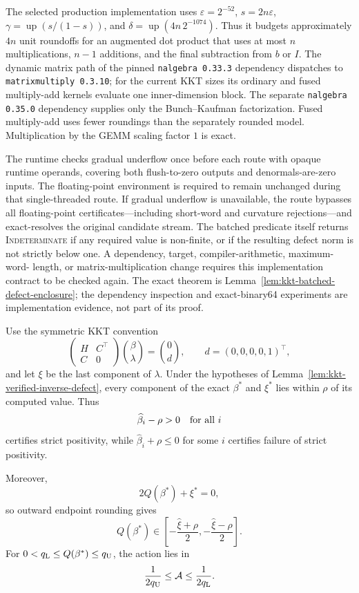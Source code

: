 \begin{remark}%
\label{rem:kkt-batched-binary64-contract}
The selected production implementation uses
\(\varepsilon=2^{-52}\), \(s=2n\varepsilon\),
\(\gamma=\operatorname{up}(s/(1-s))\), and
\(\delta=\operatorname{up}(4n\,2^{-1074})\).
Thus it budgets approximately \(4n\) unit roundoffs for an augmented dot
product that uses at most \(n\) multiplications, \(n-1\) additions, and the
final subtraction from \(b\) or \(I\).  The dynamic
matrix path of the pinned \texttt{nalgebra 0.33.3} dependency dispatches to
\texttt{matrixmultiply 0.3.10}; for the current KKT sizes its ordinary and
fused multiply-add kernels evaluate one inner-dimension block.  The separate
\texttt{nalgebra 0.35.0} dependency supplies only the Bunch--Kaufman
factorization.  Fused
multiply-add uses fewer roundings than the separately rounded model.
Multiplication by the GEMM scaling factor \(1\) is exact.

The runtime checks gradual underflow once before each route with opaque runtime
operands, covering both flush-to-zero outputs and denormals-are-zero inputs.
The floating-point environment is required to remain unchanged during that
single-threaded route.  If gradual underflow is unavailable, the route bypasses
all floating-point certificates---including short-word and curvature
rejections---and exact-resolves the original candidate stream.  The batched
predicate itself returns \textsc{Indeterminate}
if any required value is non-finite, or if the resulting defect norm is not
strictly below one.  A dependency, target, compiler-arithmetic, maximum-word-
length, or matrix-multiplication change requires this implementation contract
to be checked again.  The exact theorem is
Lemma~\ref{lem:kkt-batched-defect-enclosure}; the dependency inspection and
exact-binary64 experiments are implementation evidence, not part of its proof.
\end{remark}

\begin{corollary}%
\label{cor:kkt-beta-q-from-xi}
Use the symmetric KKT convention
\[
 \begin{pmatrix}H&C^\top\\ C&0\end{pmatrix}
 \binom{\beta}{\lambda}
 =
 \binom{0}{d},
 \qquad
 d=(0,0,0,0,1)^\top,
\]
and let \(\xi\) be the last component of \(\lambda\).  Under the hypotheses of
Lemma~\ref{lem:kkt-verified-inverse-defect}, every component of the exact
\(\beta^*\) and \(\xi^*\) lies within \(\rho\) of its computed value.  Thus
\[
 \widehat\beta_i-\rho>0\quad\hbox{for all \(i\)}
\]
certifies strict positivity, while
\(\widehat\beta_i+\rho\leq0\) for some \(i\) certifies failure of strict
positivity.

Moreover,
\[
 2Q(\beta^*)+\xi^*=0,
\]
so outward endpoint rounding gives
\[
 Q(\beta^*)\in
 \left[-\frac{\widehat\xi+\rho}{2},
       -\frac{\widehat\xi-\rho}{2}\right].
\]
For \(0<q_{\rm L}\leq Q(\beta^*)\leq q_{\rm U}\), the action lies in
\[
 \frac1{2q_{\rm U}}
 \leq \mathcal A
 \leq \frac1{2q_{\rm L}}.
\]
\end{corollary}

